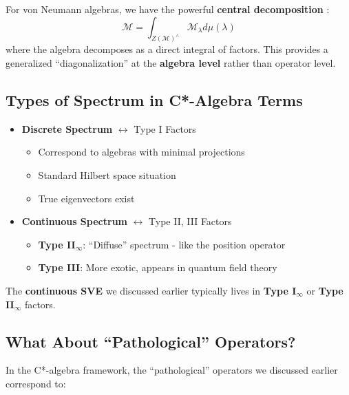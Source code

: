 \documentclass[aps,prl,reprint]{revtex4-2}
\begin{document}
For von Neumann algebras, we have the powerful \textbf{central decomposition}%
: 
\begin{equation*}
\mathcal{M} = \int_{Z(\mathcal{M})^\wedge} \mathcal{M}_\lambda d\mu(\lambda) 
\end{equation*}
where the algebra decomposes as a direct integral of factors. This provides
a generalized ``diagonalization'' at the \textbf{algebra level} rather than
operator level.

\subsection*{Types of Spectrum in C*-Algebra Terms}

\begin{itemize}
\item \textbf{Discrete Spectrum} $\leftrightarrow$ Type I Factors 

\begin{itemize}
\item Correspond to algebras with minimal projections 

\item Standard Hilbert space situation 

\item True eigenvectors exist 
\end{itemize}

\item \textbf{Continuous Spectrum} $\leftrightarrow$ Type II, III Factors 

\begin{itemize}
\item \textbf{Type II$_\infty$}: ``Diffuse'' spectrum - like the position
operator 

\item \textbf{Type III}: More exotic, appears in quantum field theory 
\end{itemize}
\end{itemize}

The \textbf{continuous SVE} we discussed earlier typically lives in \textbf{%
Type I$_\infty$} or \textbf{Type II$_\infty$} factors.

\subsection*{What About ``Pathological'' Operators?}

In the C*-algebra framework, the ``pathological'' operators we discussed
earlier correspond to:
\end{document}
